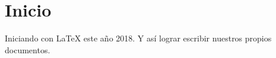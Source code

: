 \documentclass[12pt]{book}
\begin{document}
\chapter{Inicio}
Iniciando con LaTeX este año 2018. Y así lograr escribir nuestros propios documentos.
\end{document}
